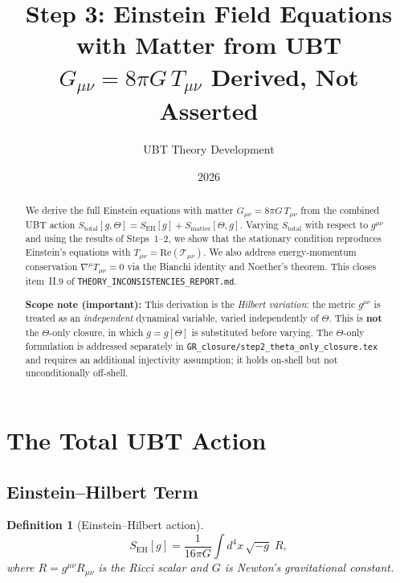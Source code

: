 \documentclass[12pt]{article}
\title{Step 3: Einstein Field Equations with Matter from UBT\\
\large $G_{\mu\nu} = 8\pi G\,T_{\mu\nu}$ Derived, Not Asserted}
\author{UBT Theory Development}
\date{2026}
\newtheorem{definition}{Definition}[section]
\begin{document}
\maketitle

\begin{abstract}
We derive the full Einstein equations with matter $G_{\mu\nu} = 8\pi G\,T_{\mu\nu}$
from the combined UBT action $S_{\mathrm{total}}[g,\Theta]
= S_{\mathrm{EH}}[g] + S_{\mathrm{matter}}[\Theta, g]$.
Varying $S_{\mathrm{total}}$ with respect to $g^{\mu\nu}$ and using the
results of Steps~1--2, we show that the stationary condition reproduces
Einstein's equations with $T_{\mu\nu} = \mathrm{Re}(\mathcal{T}_{\mu\nu})$.
We also address energy-momentum conservation $\nabla^\mu T_{\mu\nu} = 0$
via the Bianchi identity and Noether's theorem.
This closes item~II.9 of \texttt{THEORY\_INCONSISTENCIES\_REPORT.md}.

\medskip
\textbf{Scope note (important):} This derivation is the \emph{Hilbert variation}:
the metric $g^{\mu\nu}$ is treated as an \emph{independent} dynamical variable,
varied independently of $\Theta$.  This is \textbf{not} the $\Theta$-only closure,
in which $g = g[\Theta]$ is substituted before varying.  The $\Theta$-only formulation
is addressed separately in \texttt{GR\_closure/step2\_theta\_only\_closure.tex}
and requires an additional injectivity assumption; it holds on-shell but not
unconditionally off-shell.
\end{abstract}

\tableofcontents

\section{The Total UBT Action}

\subsection{Einstein--Hilbert Term}

\begin{definition}[Einstein--Hilbert action]
\label{def:EH}
\begin{equation}
  \label{eq:S_EH}
  S_{\mathrm{EH}}[g] = \frac{1}{16\pi G}\int d^4x\,\sqrt{-g}\; R,
\end{equation}
where $R = g^{\mu\nu}R_{\mu\nu}$ is the Ricci scalar and
$G$ is Newton's gravitational constant.
\end{definition}
\end{document}
